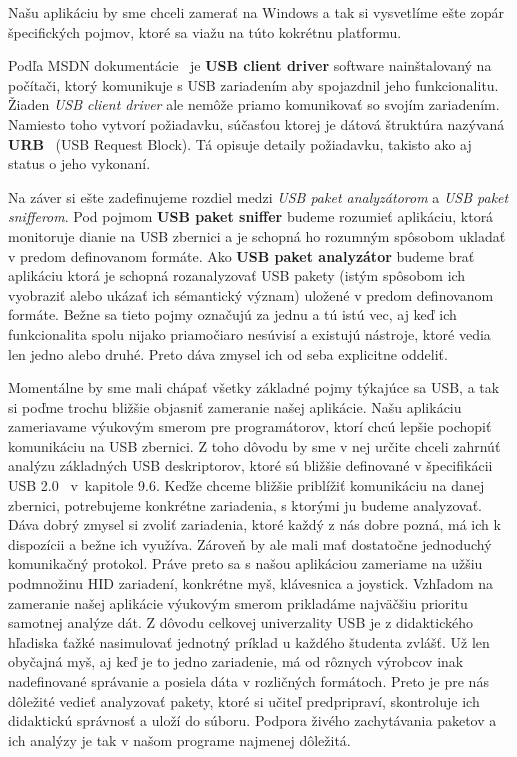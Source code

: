 Našu aplikáciu by sme chceli zamerať na Windows a tak si vysvetlíme ešte zopár špecifických pojmov, ktoré sa viažu na túto kokrétnu platformu.

Podľa MSDN dokumentácie~\cite{usbclientdriver} je \textbf{USB client driver} software nainštalovaný na počítači, ktorý komunikuje s USB zariadením aby spojazdnil jeho funkcionalitu. Žiaden \textit{USB client driver} ale nemôže priamo komunikovať so svojím zariadením. Namiesto toho vytvorí požiadavku, súčasťou ktorej je dátová štruktúra nazývaná \textbf{URB}~\cite{usburb} (USB Request Block). Tá opisuje detaily požiadavku, takisto ako aj status o jeho vykonaní.

Na záver si ešte zadefinujeme rozdiel medzi \textit{USB paket analyzátorom} a \textit{USB paket snifferom}. Pod pojmom \textbf{USB paket sniffer} budeme rozumieť aplikáciu, ktorá monitoruje dianie na USB zbernici a je schopná ho rozumným spôsobom ukladať v predom definovanom formáte. Ako \textbf{USB paket analyzátor} budeme brať aplikáciu ktorá je schopná rozanalyzovať USB pakety (istým spôsobom ich vyobraziť alebo ukázať ich sémantický význam) uložené v predom definovanom formáte. Bežne sa tieto pojmy označujú za jednu a tú istú vec, aj keď ich funkcionalita spolu nijako priamočiaro nesúvisí a existujú nástroje, ktoré vedia len jedno alebo druhé. Preto dáva zmysel ich od seba explicitne oddeliť.

Momentálne by sme mali chápať všetky základné pojmy týkajúce sa USB, a tak si poďme trochu bližšie objasniť zameranie našej aplikácie. Našu aplikáciu zameriavame výukovým smerom pre programátorov, ktorí chcú lepšie pochopiť komunikáciu na USB zbernici. Z toho dôvodu by sme v nej určite chceli zahrnúť analýzu základných USB deskriptorov, ktoré sú bližšie definované v špecifikácii USB 2.0~\cite{usbdoc} v~kapitole 9.6. Keďže chceme bližšie priblížiť komunikáciu na danej zbernici, potrebujeme konkrétne zariadenia, s ktorými ju budeme analyzovať. Dáva dobrý zmysel si zvoliť zariadenia, ktoré každý z nás dobre pozná, má ich k dispozícii a bežne ich využíva. Zároveň by ale mali mať dostatočne jednoduchý komunikačný protokol. Práve preto sa s našou aplikáciou zameriame na užšiu podmnožinu HID zariadení, konkrétne myš, klávesnica a joystick. Vzhľadom na zameranie našej aplikácie výukovým smerom prikladáme najväčšiu prioritu samotnej analýze dát.  Z dôvodu celkovej univerzality USB je z didaktického hľadiska ťažké nasimulovať jednotný príklad u každého študenta zvlášť. Už len obyčajná myš, aj keď je to jedno zariadenie, má od rôznych výrobcov inak nadefinované správanie a posiela dáta v rozličných formátoch. Preto je pre nás dôležité vedieť analyzovať pakety, ktoré si učiteľ predpripraví, skontroluje ich didaktickú správnosť a uloží do súboru. Podpora živého zachytávania paketov a ich analýzy je tak v našom programe najmenej dôležitá.

